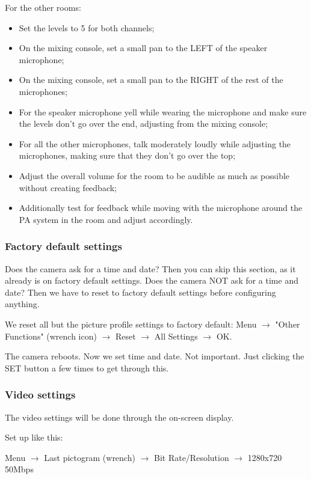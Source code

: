 \documentclass{article}
\begin{document}
For the other rooms:

\begin{itemize}
  \item Set the levels to 5 for both channels;
  \item On the mixing console, set a small pan to the LEFT of the speaker microphone;
  \item On the mixing console, set a small pan to the RIGHT of the rest of the microphones;
  \item For the speaker microphone yell while wearing the microphone and make sure the levels don't go over the end, adjusting from the mixing console;
  \item For all the other microphones, talk moderately loudly while adjusting the microphones, making sure that they don't go over the top;
  \item Adjust the overall volume for the room to be audible as much as possible without creating feedback;
  \item Additionally test for feedback while moving with the microphone around the PA system in the room and adjust accordingly.
\end{itemize}

\subsubsection{Factory default settings}
Does the camera ask for a time and date? Then you can skip this section, as it already is on factory default settings.
Does the camera NOT ask for a time and date? Then we have to reset to factory default settings before configuring anything.

We reset all but the picture profile settings to factory default:
Menu $\rightarrow$ "Other Functions" (wrench icon) $\rightarrow$ Reset $\rightarrow$ All Settings $\rightarrow$ OK.

The camera reboots. Now we set time and date. Not important. Just clicking the SET button a few times to get through this.


\subsubsection{Video settings}
The video settings will be done through the on-screen display.

Set up like this:

Menu $\rightarrow$ Last pictogram (wrench) $\rightarrow$ Bit Rate/Resolution $\rightarrow$ 1280x720 50Mbps
\end{document}

